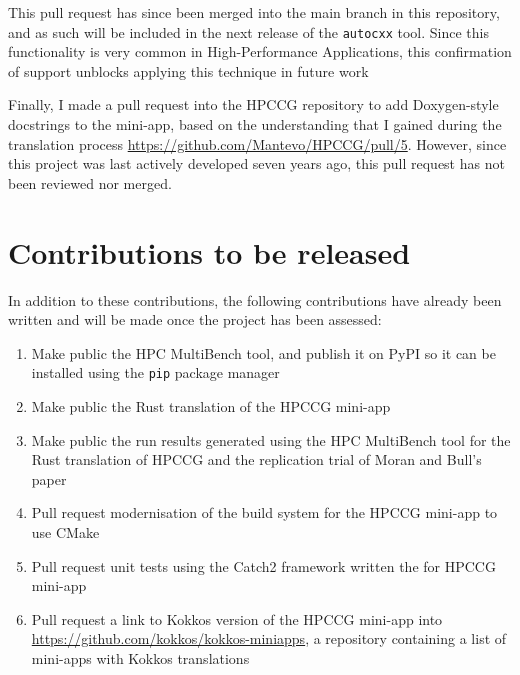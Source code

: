 
This pull request has since been merged into the main branch in this repository, and as such will be included in the next release of the \texttt{autocxx} tool. Since this functionality is very common in High-Performance Applications, this confirmation of support unblocks applying this technique in future work

Finally, I made a pull request into the HPCCG repository to add Doxygen-style docstrings to the mini-app, based on the understanding that I gained during the translation process \url{https://github.com/Mantevo/HPCCG/pull/5}. However, since this project was last actively developed seven years ago, this pull request has not been reviewed nor merged.

\section{Contributions to be released}
\label{sec:open-source-to-be-released}

In addition to these contributions, the following contributions have already been written and will be made once the project has been assessed:

\begin{enumerate}
    \item Make public the HPC MultiBench tool, and publish it on PyPI so it can be installed using the \texttt{pip} package manager
    \item Make public the Rust translation of the HPCCG mini-app
    \item Make public the run results generated using the HPC MultiBench tool for the Rust translation of HPCCG and the replication trial of Moran and Bull's paper \cite{moranEmergingTechnologiesRust2023}
    \item Pull request modernisation of the build system for the HPCCG mini-app to use CMake
    \item Pull request unit tests using the Catch2 framework written the for HPCCG mini-app
    \item Pull request a link to Kokkos version of the HPCCG mini-app into \url{https://github.com/kokkos/kokkos-miniapps}, a repository containing a list of mini-apps with Kokkos translations
\end{enumerate}

